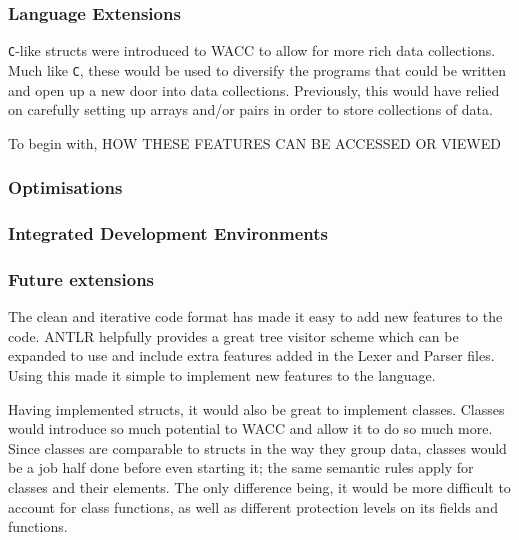 \documentclass[a4paper,12pt]{article}
\newcommand{\shell}[1]{\lstinline!#1!}
\begin{document}
\subsubsection*{Language Extensions}

\shell{C}-like structs were introduced to WACC to allow for more rich data collections. Much like \shell{C}, these would be used to diversify the programs that could be written and open up a new door into data collections. Previously, this would have relied on carefully setting up arrays and/or pairs in order to store collections of data. 

To begin with, 
HOW THESE FEATURES CAN BE ACCESSED OR VIEWED

\subsubsection*{Optimisations}

\subsubsection*{Integrated Development Environments}

\subsubsection*{Future extensions}

The clean and iterative code format has made it easy to add new features to the code. ANTLR helpfully provides a great tree visitor scheme which can be expanded to use and include extra features added in the Lexer and Parser files. Using this made it simple to implement new features to the language.

Having implemented structs, it would also be great to implement classes. Classes would introduce so much potential to WACC and allow it to do so much more. Since classes are comparable to structs in the way they group data, classes would be a job half done before even starting it; the same semantic rules apply for classes and their elements. The only difference being, it would be more difficult to account for class functions, as well as different protection levels on its fields and functions.
\end{document}
